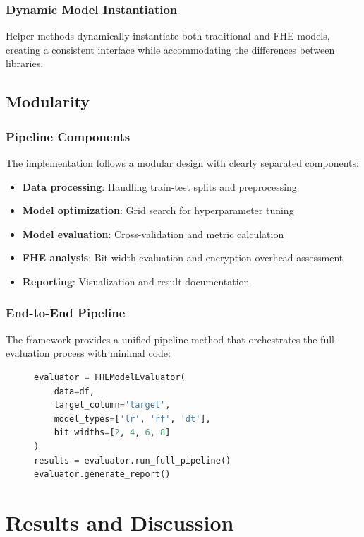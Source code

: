 \documentclass[a4paper,12pt]{article}
\begin{document}
\subsubsection{Dynamic Model Instantiation}
Helper methods dynamically instantiate both traditional and FHE models, creating a consistent interface while accommodating the differences between libraries.

\subsection{Modularity}
\subsubsection{Pipeline Components}
The implementation follows a modular design with clearly separated components:
\begin{itemize}
    \item \textbf{Data processing}: Handling train-test splits and preprocessing
    \item \textbf{Model optimization}: Grid search for hyperparameter tuning
    \item \textbf{Model evaluation}: Cross-validation and metric calculation
    \item \textbf{FHE analysis}: Bit-width evaluation and encryption overhead assessment
    \item \textbf{Reporting}: Visualization and result documentation
\end{itemize}

\subsubsection{End-to-End Pipeline}
The framework provides a unified pipeline method that orchestrates the full evaluation process with minimal code:
\begin{figure}[h]
    \centering
    \begin{lstlisting}[language=Python, caption=Example usage of framework, label=lst:usage]
evaluator = FHEModelEvaluator(
    data=df, 
    target_column='target',
    model_types=['lr', 'rf', 'dt'],
    bit_widths=[2, 4, 6, 8]
)
results = evaluator.run_full_pipeline()
evaluator.generate_report()
    \end{lstlisting}
\end{figure}

\section{Results and Discussion}
\end{document}
